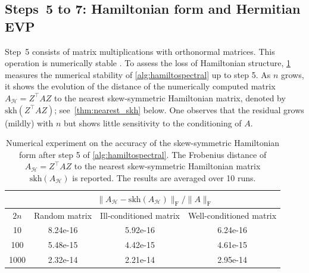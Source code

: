 \documentclass[final,onefignum,onetabnum,dvipsnames]{siamart251216}
\numberwithin{algorithm}{section}
\numberwithin{equation}{section}
\begin{document}
\subsection{Steps~5 to 7: Hamiltonian form and Hermitian EVP} Step~5 consists of matrix multiplications with orthonormal matrices. This operation is numerically stable \cite[Chap.~3.6]{Higham2002}.
To assess the loss of Hamiltonian structure, \cref{tab:hamiltonian_form} measures the numerical stability of \cref{alg:hamiltospectral} up to step 5. As $n$ grows, it shows the evolution of the distance of the numerically computed matrix $A_\mathcal{H} = Z^\top A Z$ to the nearest skew-symmetric Hamiltonian matrix, denoted by $\mathrm{skh}(Z^\top A Z)$; see~\cref{thm:nearest_skh} below.
One observes that the residual grows (mildly) with $n$ but shows little sensitivity
to the conditioning of $A$.
\begin{table}[ht]
    \centering
    \begin{tabular}{||c|c|c|c||}
    \hline
         &\multicolumn{3}{|c||}{$\|A_\mathcal{H}-\mathrm{skh}(A_\mathcal{H})\|_\mathrm{F}/\|A\|_\mathrm{F}$} \\
         \hline
         $2n$&Random matrix&Ill-conditioned matrix&Well-conditioned matrix\\ 
         \hline
         10&8.24e-16&5.92e-16&6.24e-16\\
        100& 5.48e-15& 4.42e-15& 4.61e-15\\
        1000& 2.32e-14& 2.21e-14& 2.95e-14\\
        \hline
    \end{tabular}
    \caption{Numerical experiment on the accuracy of the skew-symmetric Hamiltonian form after step 5 of \cref{alg:hamiltospectral}. The Frobenius distance of $A_\mathcal{H}=Z^\top A Z$ to the nearest skew-symmetric Hamiltonian matrix $\mathrm{skh}(A_\mathcal{H})$ is reported. The results are averaged over 10 runs.}
    \label{tab:hamiltonian_form}
\end{table}

\end{document}
